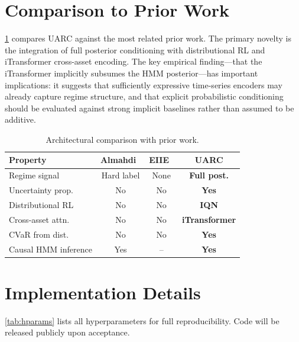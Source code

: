 \documentclass[sigconf,nonacm]{acmart}
\begin{document}
\section{Comparison to Prior Work}
\label{sec:novelty}

\cref{tab:novelty} compares \textsc{UARC} against the most related prior work.
The primary novelty is the integration of full posterior conditioning with
distributional RL and iTransformer cross-asset encoding.
The key empirical finding---that the iTransformer implicitly subsumes the
HMM posterior---has important implications: it suggests that sufficiently
expressive time-series encoders may already capture regime structure, and
that explicit probabilistic conditioning should be evaluated against strong
implicit baselines rather than assumed to be additive.

\begin{table}[h]
  \caption{Architectural comparison with prior work.}
  \label{tab:novelty}
  \small
  \begin{tabular}{lccc}
    \toprule
    Property & Almahdi~\cite{almahdi2019} & EIIE~\cite{jiang2017} & \textbf{UARC} \\
    \midrule
    Regime signal        & Hard label & None & \textbf{Full post.} \\
    Uncertainty prop.    & No  & No & \textbf{Yes} \\
    Distributional RL    & No  & No & \textbf{IQN} \\
    Cross-asset attn.    & No  & No & \textbf{iTransformer} \\
    CVaR from dist.      & No  & No & \textbf{Yes} \\
    Causal HMM inference & Yes & -- & \textbf{Yes} \\
    \bottomrule
  \end{tabular}
\end{table}

\section{Implementation Details}
\label{sec:impl}

\cref{tab:hparams} lists all hyperparameters for full reproducibility.
Code will be released publicly upon acceptance.
\end{document}
